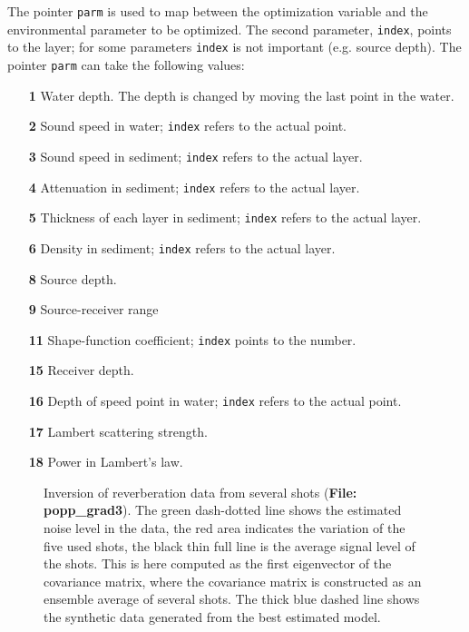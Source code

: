 \documentclass{saclantc}
\begin{document}
The pointer {\tt parm} is used to map between the optimization variable and the
environmental parameter to be optimized. The second parameter, {\tt index}, points to the
layer; for some parameters {\tt index} is not important (e.g. source depth).  
The pointer {\tt parm} can take the following values:
\begin{itemize}
    \item[\bf 1]  Water depth. The depth is changed by moving the last 
point in the water.
\vspace{-0.3cm}
    \item[\bf 2] Sound speed in water; {\tt index} refers to the actual point.
\vspace{-0.3cm}
    \item[\bf 3] Sound speed in sediment; 
    {\tt index} refers to the actual layer.
\vspace{-0.3cm}
    \item[\bf 4] Attenuation in sediment; 
    {\tt index} refers to the actual layer. 
\vspace{-0.3cm}
    \item[\bf 5]  Thickness of each layer in sediment; 
    {\tt index} refers to the actual layer.
\vspace{-0.3cm}
    \item[\bf 6] Density in sediment;
    {\tt index} refers to the actual layer.
\vspace{-0.3cm}
    \item[\bf 8] Source depth.
\vspace{-0.3cm}
    \item[\bf 9] Source-receiver range
\vspace{-0.3cm}
    \item[\bf 11] Shape-function coefficient; {\tt index} points to the number.
\vspace{-0.3cm}
    \item[\bf 15]  Receiver depth.
\vspace{-0.3cm}
    \item[\bf 16]  Depth of speed point  in water;
               {\tt index} refers to the actual point.
\vspace{-0.3cm}
    \item[\bf 17] Lambert scattering strength.
\vspace{-0.3cm}
    \item[\bf 18]  Power in Lambert's law.  
\end{itemize}

\begin{figure}
\epsfxsize=14cm
\centerline{}
\caption{Inversion of reverberation data from several shots
({\bf File: popp\_grad3}). The green dash-dotted line shows
the estimated noise level in the data, the red area indicates the
variation of the five used shots, 
the black thin full line is the average signal level
of the shots. This is here computed as the first eigenvector of the
covariance matrix, where the covariance matrix is constructed as an
ensemble average of several shots. The thick blue 
dashed line shows the synthetic data
generated from the best estimated model.}
\label{fig:rev}
\end{figure}
\end{document}
